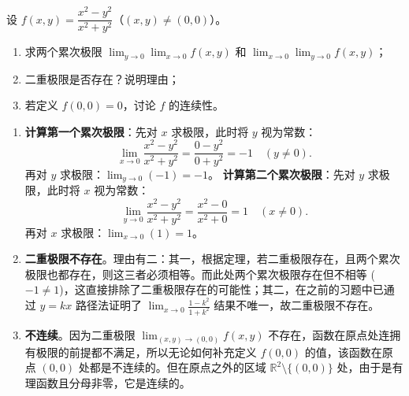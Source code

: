 \documentclass[lang=cn,11pt]{elegantbook}
\begin{document}
\begin{exercise}[提高：累次极限与二重极限]
设 $f(x,y)=\dfrac{x^2-y^2}{x^2+y^2}$（$(x,y) \neq (0,0)$）。
\begin{enumerate}
  \item[(1)] 求两个累次极限 $\lim_{y\to 0}\lim_{x\to 0}f(x,y)$ 和 $\lim_{x\to 0}\lim_{y\to 0}f(x,y)$；
  \item[(2)] 二重极限是否存在？说明理由；
  \item[(3)] 若定义 $f(0,0)=0$，讨论 $f$ 的连续性。
\end{enumerate}
\end{exercise}
\begin{solution}
\begin{enumerate}
  \item[(1)] \textbf{计算第一个累次极限}：先对 $x$ 求极限，此时将 $y$ 视为常数：
  \[
  \lim_{x\to 0} \frac{x^2-y^2}{x^2+y^2} = \frac{0-y^2}{0+y^2} = -1 \quad (y \neq 0).
  \]
  再对 $y$ 求极限：$\displaystyle\lim_{y\to 0}(-1) = -1$。
  \textbf{计算第二个累次极限}：先对 $y$ 求极限，此时将 $x$ 视为常数：
  \[
  \lim_{y\to 0} \frac{x^2-y^2}{x^2+y^2} = \frac{x^2-0}{x^2+0} = 1 \quad (x \neq 0).
  \]
  再对 $x$ 求极限：$\displaystyle\lim_{x\to 0}(1) = 1$。
  
  \item[(2)] \textbf{二重极限不存在}。理由有二：其一，根据定理，若二重极限存在，且两个累次极限也都存在，则这三者必须相等。而此处两个累次极限存在但不相等 ($-1 \neq 1$)，这直接排除了二重极限存在的可能性；其二，在之前的习题中已通过 $y=kx$ 路径法证明了 $\lim_{x\to 0}\frac{1-k^2}{1+k^2}$ 结果不唯一，故二重极限不存在。

  \item[(3)] \textbf{不连续}。因为二重极限 $\displaystyle\lim_{(x,y)\to(0,0)}f(x,y)$ 不存在，函数在原点处连拥有极限的前提都不满足，所以无论如何补充定义 $f(0,0)$ 的值，该函数在原点 $(0,0)$ 处都是不连续的。但在原点之外的区域 $\mathbb{R}^2 \setminus \{(0,0)\}$ 处，由于是有理函数且分母非零，它是连续的。
\end{enumerate}
\end{solution}
\end{document}
